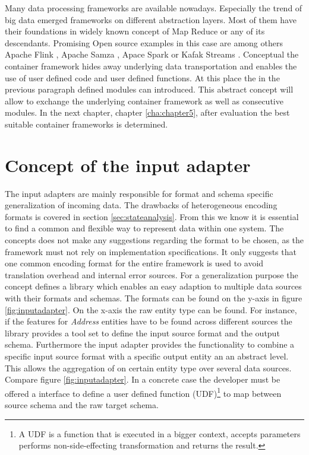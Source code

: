 Many data processing frameworks are available nowadays. Especially the trend of big data emerged frameworks on different abstraction layers. Most of them have their foundations in widely known concept of Map Reduce
or any of its descendants. Promising Open source examples in this case are among others Apache Flink
, Apache Samza
, Apace Spark
or Kafak Streams
%
. Conceptual the container framework hides away underlying data transportation and enables the use of user defined code and user defined functions. At this place the in the previous paragraph defined modules can introduced. This abstract concept will allow to exchange the underlying container framework as well as consecutive modules. In the next chapter, chapter \ref{cha:chapter5}, after evaluation the best suitable container frameworks is determined.

\section{Concept of the input adapter \label{sec:inputadapter}}

The input adapters are mainly responsible for format and schema specific generalization of incoming data. The drawbacks of heterogeneous encoding formats is covered in section \ref{sec:stateanalysis}. From this we know it is essential to find a common and flexible way to represent data within one system. The concepts does not make any suggestions regarding the format to be chosen, as the framework must not rely on implementation specifications. It only suggests that one common encoding format for the entire framework is used to avoid translation overhead and internal error sources. For a generalization purpose the concept defines a library which enables an easy adaption to multiple data sources with their formats and schemas. The formats can be found on the y-axis in figure \ref{fig:inputadapter}. On the x-axis the raw entity type can be found. For instance, if the features for \textit{Address} entities have to be found across different sources the library provides a tool set to define the input source format and the output schema. Furthermore the input adapter provides the functionality to combine a specific input source format with a specific output entity an an abstract level. This allows the aggregation of on certain entity type over several data sources. Compare figure \ref{fig:inputadapter}. In a concrete case the developer must be offered a interface to define a user defined function (UDF)\footnote{A UDF is a function that is executed in a bigger context, accepts parameters performs non-side-effecting transformation and returns the result.} to map between source schema and the raw target schema. 

